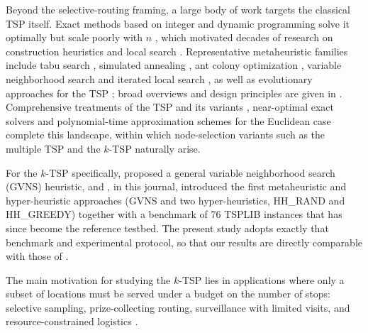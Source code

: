 Beyond the selective-routing framing, a large body of work targets the classical
TSP itself. Exact methods based on integer and dynamic programming solve it
optimally but scale poorly with $n$ \citep{dantzig1954,bellman1962,heldkarp1962,karp1972},
which motivated decades of research on construction heuristics and local search
\citep{lin1965,christofides1976,bentley1992,johnson1997,laporte1992}. Representative
metaheuristic families include tabu search \citep{glover1986,gloverlaguna1997,knox1994},
simulated annealing \citep{cerny1985}, ant colony optimization \citep{dorigo1997acs},
variable neighborhood search \citep{mladenovic1997vns} and iterated local search
\citep{martin1991}, as well as evolutionary approaches for the TSP
\citep{potvin1996}; broad overviews and design principles are given in
\citep{blumroli2003,talbi2009}. Comprehensive treatments of the TSP and its
variants \citep{gutin2007book}, near-optimal exact solvers
\citep{applegate2006concorde} and polynomial-time approximation schemes for the
Euclidean case \citep{arora1998} complete this landscape, within which
node-selection variants such as the multiple TSP \citep{bektas2006} and the $k$-TSP
naturally arise.

For the $k$-TSP specifically, \citet{venkatesh2018} proposed a general variable
neighborhood search (GVNS) heuristic, and \citet{pandiri2020}, in this journal,
introduced the first metaheuristic and hyper-heuristic approaches (GVNS and two
hyper-heuristics, HH\_RAND and HH\_GREEDY) together with a benchmark of 76 TSPLIB
instances that has since become the reference testbed. The present study adopts
exactly that benchmark and experimental protocol, so that our results are directly
comparable with those of \citet{pandiri2020}.

The main motivation for studying the $k$-TSP lies in applications where only a
subset of locations must be served under a budget on the number of stops:
selective sampling, prize-collecting routing, surveillance with limited visits,
and resource-constrained logistics \citep{vansteenwegen2011top,blanchard2023}.

